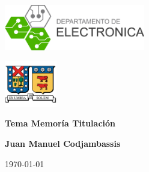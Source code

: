 \begin{titlepage}
    \begin{minipage}[t]{0.45\textwidth}
        \includegraphics[height=2cm]{img/logoELO.png}
    \end{minipage}
    \hfill
    \begin{minipage}[t]{0.45\textwidth}
        \hfill
        \includegraphics[height=2cm]{img/logoUTFSM.png}
    \end{minipage}
    
    \vspace{3.5cm}
    
    \begin{center}
        \Huge\textbf{Tema Memoría Titulación}
    \end{center}
    
    \vspace{5cm}
    
    \begin{center}
        \Large\textbf{Juan Manuel Codjambassis}
    \end{center}
    
    \vfill
    
    \begin{center}
        \today
    \end{center}
    
\end{titlepage}

